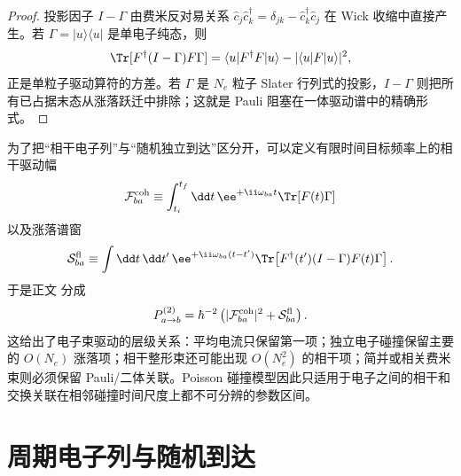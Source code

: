 \begin{proof}
投影因子 $I-\Gamma$ 由费米反对易关系
$\hat c_j\hat c_k^\dagger=\delta_{jk}-\hat c_k^\dagger\hat c_j$
在 Wick 收缩中直接产生。若 $\Gamma=|u\rangle\langle u|$ 是单电子纯态，则
\[
\Tr[F^\dagger(I-\Gamma)F\Gamma]
=\langle u|F^\dagger F|u\rangle
-|\langle u|F|u\rangle|^2,
\]
正是单粒子驱动算符的方差。若 $\Gamma$ 是 $N_e$ 粒子 Slater 行列式的投影，$I-\Gamma$ 则把所有已占据末态从涨落跃迁中排除；这就是 Pauli 阻塞在一体驱动谱中的精确形式。

\end{proof}


为了把“相干电子列”与“随机独立到达”区分开，可以定义有限时间目标频率上的相干驱动幅
\begin{equation*}
\mathcal F_{ba}^{\rm coh}
\equiv
\int_{t_i}^{t_f}\dd t\,
\ee^{+\ii\omega_{ba}t}
\Tr[F(t)\Gamma]
\end{equation*}
以及涨落谱窗
\begin{equation*}
\mathcal S_{ba}^{\rm fl}
\equiv
\int\dd t\,\dd t'\,
\ee^{+\ii\omega_{ba}(t-t')}
\Tr\!\left[
F^\dagger(t')(I-\Gamma)F(t)\Gamma
\right].
\end{equation*}
于是正文 分成
\[
P_{a\to b}^{(2)}
=\hbar^{-2}
\left(
|\mathcal F_{ba}^{\rm coh}|^2
+\mathcal S_{ba}^{\rm fl}
\right).
\]
这给出了电子束驱动的层级关系：平均电流只保留第一项；独立电子碰撞保留主要的 $O(N_e)$ 涨落项；相干整形束还可能出现 $O(N_e^2)$ 的相干项；简并或相关费米束则必须保留 Pauli/二体关联。Poisson 碰撞模型因此只适用于电子之间的相干和交换关联在相邻碰撞时间尺度上都不可分辨的参数区间。

\section{周期电子列与随机到达}


